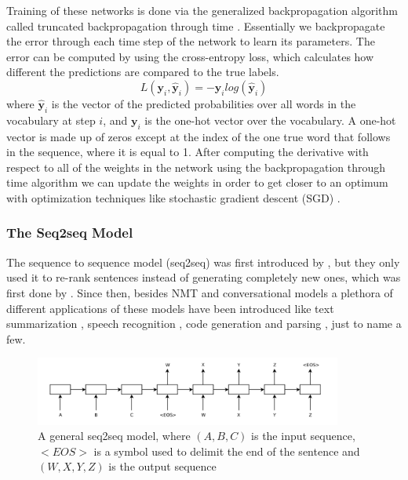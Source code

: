 \documentclass[12pt]{article}
\begin{document}
Training of these networks is done via the generalized backpropagation algorithm called truncated backpropagation through time \cite{Werbos:1990,RNN:1988}. Essentially we backpropagate the error through each time step of the network to learn its parameters. The error can be computed by using the cross-entropy loss, which calculates how different the predictions are compared to the true labels.
\begin{equation} \label{eq231c}
L(\bm{y}_i,\bm{\hat{y}}_{i})=-\bm{y}_i log(\bm{\hat{y}}_{i})
\end{equation}
where \(\bm{\hat{y}}_{i}\) is the vector of the predicted probabilities over all words in the vocabulary at step \(i\), and \(\bm{y}_i\) is the one-hot vector over the vocabulary. A one-hot vector is made up of zeros except at the index of the one true word that follows in the sequence, where it is equal to 1. After computing the derivative with respect to all of the weights in the network using the backpropagation through time algorithm we can update the weights in order to get closer to an optimum with optimization techniques like stochastic gradient descent (SGD) \cite{SGD:2010}. 

\subsubsection{The Seq2seq Model} \label{sssec:232}
The sequence to sequence model (seq2seq) was first introduced by \cite{Cho:2014}, but they only used it to re-rank sentences instead of generating completely new ones, which was first done by \cite{Sutskever:2014}. Since then, besides NMT and conversational models a plethora of different applications of these models have been introduced like text summarization \cite{Nallapati:2016}, speech recognition \cite{Chiu:2017}, code generation \cite{Rico:2017} and parsing \cite{Konstas:2017}, just to name a few.

\begin{figure}[H]
	\label{fig:232a}
	\centering
	\includegraphics[width=0.9\textwidth]{pics/seq2seq.png}
	\caption{A general seq2seq model, where \((A,B,C)\) is the input sequence, \(<EOS>\) is a symbol used to delimit the end of the sentence and \((W,X,Y,Z)\) is the output sequence \cite{Sutskever:2014}}
\end{figure}
\end{document}
